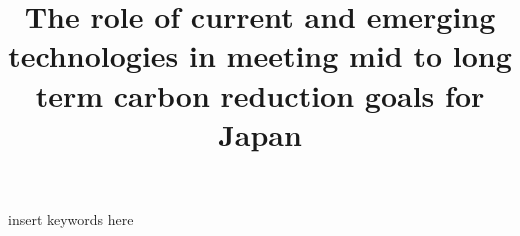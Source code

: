 \documentclass[review]{elsarticle}
\begin{document}
\begin{frontmatter}
\title{The role of current and emerging technologies in meeting mid to long term carbon reduction goals for Japan}

\date{}                     %




	
\begin{keyword}
insert keywords here
\end{keyword}



\end{frontmatter}
\glsresetall

\linenumbers



\FloatBarrier

\FloatBarrier

\FloatBarrier

\FloatBarrier

\FloatBarrier

\FloatBarrier

\FloatBarrier


\newpage
\appendix

\end{document}
